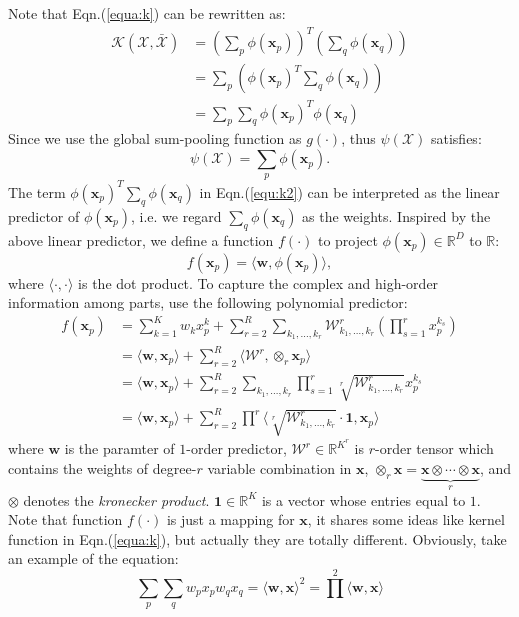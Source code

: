 \documentclass[a4paper,4pt]{article}
\begin{document}
 Note that Eqn.(\ref{equa:k}) can be rewritten as:
 \begin{equation}\label{equ:k2}
    \begin{aligned}
        \mathcal{K}(\bm{\mathcal{X}},\bm{\bar{\mathcal{X}}})
        &=(\sum_p \phi(\bm{x}_p))^T(\sum_q \phi(\bm{x}_q))
        \\
        &=\sum_p (\phi(\bm{x}_p)^T \sum_q \phi(\bm{x}_q))
        \\
        &=\sum_p\sum_q \phi(\bm{x}_p)^T\phi(\bm{x}_q)
    \end{aligned}
 \end{equation}
Since we use the global sum-pooling function as $g(\cdot)$, thus $\psi(\bm{\mathcal{X}})$ satisfies:
\begin{equation}    
    \psi(\bm{\mathcal{X}})=\sum_p \phi(\bm{x}_p).
\end{equation}
The term $\phi(\bm{x}_p)^T \sum_q \phi(\bm{x}_q)$ in Eqn.(\ref{equ:k2}) can be
interpreted as the linear predictor of $\phi(\bm{x}_p)$, i.e. we regard
$\sum_q \phi(\bm{x}_q)$ as the weights. Inspired by the above linear
predictor, we define a function $f(\cdot)$ to project $\phi(\bm{x}_p) \in \mathbb{R}^D$ to
$\mathbb{R}$:
\begin{equation}
    f(\bm{x}_p)= \langle \bm{w},\phi(\bm{x}_p) \rangle,
\end{equation}
where $\langle \cdot,\cdot \rangle$ is the dot product. To capture the complex and high-order 
information among parts, use the following polynomial predictor:
\begin{equation}\label{eqn:tensor}
    \begin{aligned}
        f(\bm{x}_p) 
        &= \sum_{k=1}^K w_kx_p^k + \sum_{r=2}^R\sum_{k_1,\dots,k_r} 
        \mathcal{W}^r_{k_1,\dots,k_r} (\prod_{s=1}^r x_p^{k_s})
        \\
        &= \langle \bm{w},\bm{x}_p  \rangle + \sum_{r=2}^R
        \langle  \bm{\mathcal{W}}^r,\otimes_r \bm{x}_p \rangle
        \\
        &=\langle \bm{w},\bm{x}_p \rangle + \sum_{r=2}^R\sum_{k_1,\dots,k_r} 
         \prod_{s=1}^r \sqrt[r]{\mathcal{W}^r_{k_1,\dots,k_r}} x_p^{k_s}
        \\
        &=\langle \bm{w},\bm{x}_p \rangle + \sum_{r=2}^R
        \prod^r \langle \sqrt[r]{\mathcal{W}^r_{k_1,\dots,k_r}} \cdot \bm{1} , \bm{x}_p \rangle
    \end{aligned}
\end{equation}
where $\bm{w}$ is the paramter of $1$-order predictor, $\bm{\mathcal{W}}^r \in \mathbb{R}^{K^r} $
is $r$-order tensor which contains the weights of degree-$r$ variable combination in $\bm{x}$,
$\otimes_r \bm{x} = \underbrace{\bm{x} \otimes\cdots\otimes \bm{x} }_r$, and $\otimes$ 
denotes the \emph{kronecker product}. $\bm{1} \in \mathbb{R}^K$ is a vector whose entries
equal to $1$.
Note that function $f(\cdot)$ is just a mapping for $\bm{x}$, it shares some ideas like
kernel function in Eqn.(\ref{equa:k}), but actually they are totally
different. Obviously, take an example of the equation:
\[
    \sum_p\sum_q w_px_pw_qx_q = \langle \bm{w},\bm{x} \rangle^2
    =\prod^2 \langle \bm{w},\bm{x} \rangle
\]
\end{document}
